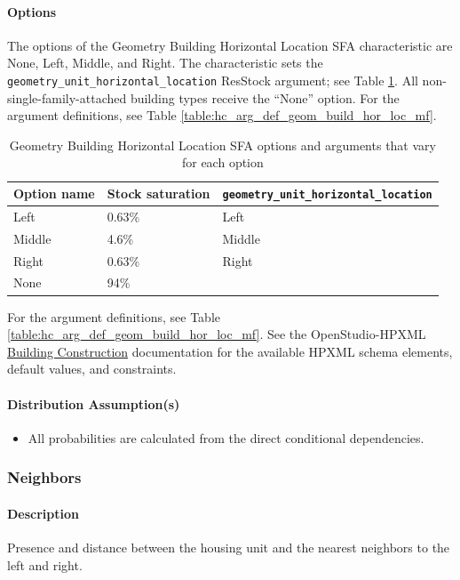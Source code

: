 \paragraph{Options}
The options of the Geometry Building Horizontal Location SFA characteristic are None, Left, Middle, and Right. The characteristic sets the \texttt{geometry\_unit\_horizontal\_location} ResStock argument; see Table \ref{table:hc_opt_geom_build_hor_loc_sfa}. All non-single-family-attached building types receive the ``None'' option. For the argument definitions, see Table \ref{table:hc_arg_def_geom_build_hor_loc_mf}.


\begin{longtable}[]{ |p{}|p{4cm}| p{4cm}|}
\caption{Geometry Building Horizontal Location SFA options and arguments that vary for each option} \label{table:hc_opt_geom_build_hor_loc_sfa}  \\
\toprule\noalign{}
Option name  & Stock saturation & \texttt{geometry\_unit\_horizontal\_location} \\
\midrule\noalign{}
\endhead
\bottomrule\noalign{}
\endlastfoot
Left & 0.63\% & Left \\ \hline
Middle & 4.6\% & Middle \\ \hline
Right & 0.63\% & Right \\ \hline
None & 94\% & \\
\end{longtable}

For the argument definitions, see Table \ref{table:hc_arg_def_geom_build_hor_loc_mf}. See the OpenStudio-HPXML \href{https://openstudio-hpxml.readthedocs.io/en/v1.8.1/workflow_inputs.html#hpxml-building-construction}{Building Construction} documentation for the available HPXML schema elements, default values, and constraints.

\paragraph{Distribution Assumption(s)}
\begin{itemize}
    \item All probabilities are calculated from the direct conditional dependencies.
\end{itemize}


\subsubsection{Neighbors}
\paragraph{Description}
Presence and distance between the housing unit and the nearest neighbors to the left and right.
